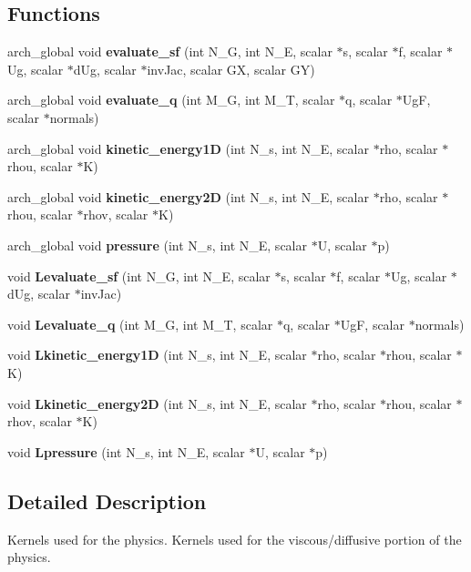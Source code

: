 \subsection*{Functions}
\begin{DoxyCompactItemize}
\item 
arch\-\_\-global void {\bf evaluate\-\_\-sf} (int N\-\_\-\-G, int N\-\_\-\-E, scalar $\ast$s, scalar $\ast$f, scalar $\ast$Ug, scalar $\ast$d\-Ug, scalar $\ast$inv\-Jac, scalar G\-X, scalar G\-Y)
\item 
arch\-\_\-global void {\bf evaluate\-\_\-q} (int M\-\_\-\-G, int M\-\_\-\-T, scalar $\ast$q, scalar $\ast$Ug\-F, scalar $\ast$normals)
\item 
arch\-\_\-global void {\bf kinetic\-\_\-energy1\-D} (int N\-\_\-s, int N\-\_\-\-E, scalar $\ast$rho, scalar $\ast$rhou, scalar $\ast$K)
\item 
arch\-\_\-global void {\bf kinetic\-\_\-energy2\-D} (int N\-\_\-s, int N\-\_\-\-E, scalar $\ast$rho, scalar $\ast$rhou, scalar $\ast$rhov, scalar $\ast$K)
\item 
arch\-\_\-global void {\bf pressure} (int N\-\_\-s, int N\-\_\-\-E, scalar $\ast$U, scalar $\ast$p)
\item 
void {\bf Levaluate\-\_\-sf} (int N\-\_\-\-G, int N\-\_\-\-E, scalar $\ast$s, scalar $\ast$f, scalar $\ast$Ug, scalar $\ast$d\-Ug, scalar $\ast$inv\-Jac)
\item 
void {\bf Levaluate\-\_\-q} (int M\-\_\-\-G, int M\-\_\-\-T, scalar $\ast$q, scalar $\ast$Ug\-F, scalar $\ast$normals)
\item 
void {\bf Lkinetic\-\_\-energy1\-D} (int N\-\_\-s, int N\-\_\-\-E, scalar $\ast$rho, scalar $\ast$rhou, scalar $\ast$K)
\item 
void {\bf Lkinetic\-\_\-energy2\-D} (int N\-\_\-s, int N\-\_\-\-E, scalar $\ast$rho, scalar $\ast$rhou, scalar $\ast$rhov, scalar $\ast$K)
\item 
void {\bf Lpressure} (int N\-\_\-s, int N\-\_\-\-E, scalar $\ast$U, scalar $\ast$p)
\end{DoxyCompactItemize}


\subsection{Detailed Description}
Kernels used for the physics. Kernels used for the viscous/diffusive portion of the physics.


